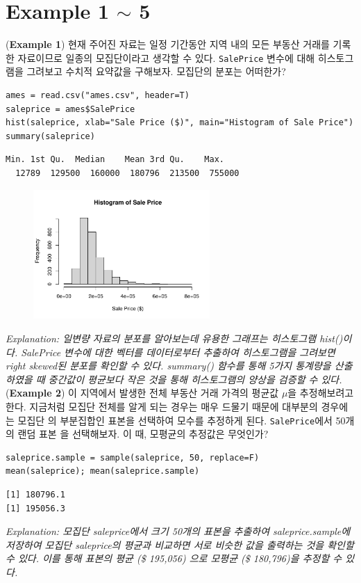 \documentclass{article}
\begin{document}
\pagestyle{fancy}

\section*{Example 1 $\sim$ 5}

(\textbf{Example 1}) 현재 주어진 자료는 일정 기간동안 지역 내의 모든 부동산 거래를 기록한 자료이므로 일종의 모집단이라고 생각할 수 있다. \texttt{SalePrice} 변수에 대해 히스토그램을 그려보고 수치적 요약값을 구해보자. 모집단의 분포는 어떠한가?
\begin{lstlisting}[style={r-style}]
ames = read.csv("ames.csv", header=T)
saleprice = ames$SalePrice
hist(saleprice, xlab="Sale Price ($)", main="Histogram of Sale Price")
summary(saleprice)
\end{lstlisting}
\begin{lstlisting}[style={out-style}]
   Min. 1st Qu.  Median    Mean 3rd Qu.    Max. 
  12789  129500  160000  180796  213500  755000 
\end{lstlisting}
\begin{figure}[htb!]
    \centering
    \includegraphics[width=0.6\textwidth]{fig/ex1.pdf}
\end{figure}
\emph{Explanation: 일변량 자료의 분포를 알아보는데 유용한 그래프는 히스토그램 hist()이다. SalePrice 변수에 대한 벡터를 데이터로부터 추출하여 히스토그램을 그려보면 right skewed된 분포를 확인할 수 있다. summary() 함수를 통해 5가지 통계량을 산출하였을 때 중간값이 평균보다 작은 것을 통해 히스토그램의 양상을 검증할 수 있다. } \\

(\textbf{Example 2}) 이 지역에서 발생한 전체 부동산 거래 가격의 평균값 $\mu$을 추정해보려고 한다. 지금처럼 모집단 전체를 알게 되는 경우는 매우 드물기 때문에 대부분의 경우에는 모집단
의 부분집합인 표본을 선택하여 모수를 추정하게 된다. \texttt{SalePrice}에서 50개의 랜덤 표본
을 선택해보자. 이 때, 모평균의 추정값은 무엇인가?
\begin{lstlisting}[style={r-style}]
saleprice.sample = sample(saleprice, 50, replace=F)
mean(saleprice); mean(saleprice.sample)
\end{lstlisting}
\begin{lstlisting}[style={out-style}]
[1] 180796.1
[1] 195056.3
\end{lstlisting}
\emph{Explanation: 모집단 saleprice에서 크기 50개의 표본을 추출하여 saleprice.sample에 저장하여 모집단 saleprice의 평균과 비교하면 서로 비슷한 값을 출력하는 것을 확인할 수 있다. 이를 통해 표본의 평균 (\$ 195,056) 으로 모평균 (\$ 180,796)을 추정할 수 있다.} \\
\end{document}
